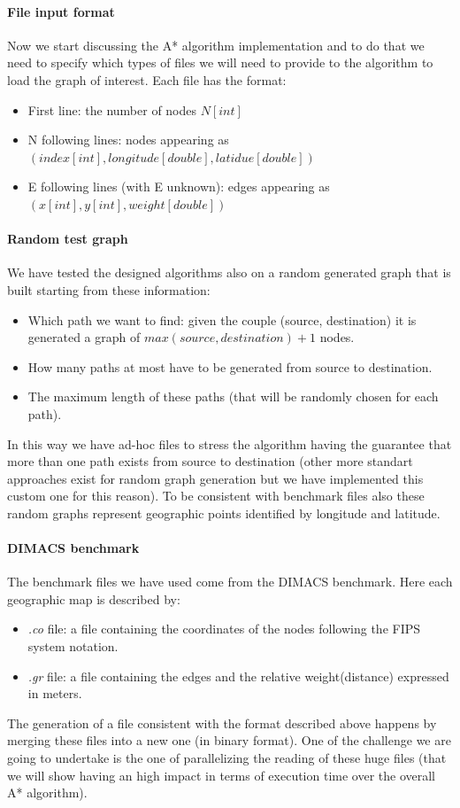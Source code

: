 \documentclass[twocolumn, switch]{article} %
\begin{document}
\paragraph{File input format} 
Now we start discussing the A* algorithm implementation and to do that we need to specify which 
types of files we will need to provide to the algorithm to load the graph of interest. Each file has 
the format:
\begin{itemize}
    \item First line: the number of nodes $N[int]$
    \item N following lines: nodes appearing as $(index[int], longitude[double], latidue[double])$
    \item E following lines (with E unknown): edges appearing as $(x[int], y[int], weight[double])$
\end{itemize}
\paragraph{Random test graph} We have tested the designed algorithms also on a random generated graph that
is built starting from these information: 
\begin{itemize}
  \item Which path we want to find: given the couple (source, destination) it is generated a graph of
        $max(source, destination) + 1$ nodes.
  \item How many paths at most have to be generated from source to destination.
  \item The maximum length of these paths (that will be randomly chosen for each path).
\end{itemize}
In this way we have ad-hoc files to stress the algorithm having the guarantee that more than one path
exists from source to destination (other more standart approaches exist for random graph generation but we
have implemented this custom one for this reason). To be consistent with benchmark files also these
random graphs represent geographic points identified by longitude and latitude.
\paragraph{DIMACS benchmark} 
The benchmark files we have used come from the DIMACS benchmark. Here each geographic map is described by:
\begin{itemize}
  \item \textit{.co} file: a file containing the coordinates of the nodes following the FIPS system notation.
  \item \textit{.gr} file: a file containing the edges and the relative weight(distance) expressed in meters.
\end{itemize}
The generation of a file consistent with the format described above happens by merging these files 
into a new one (in binary format). One of the challenge we are going to undertake is the one of
parallelizing the reading of these huge files (that we will show having an high impact in terms of
execution time over the overall A* algorithm).
\end{document}
